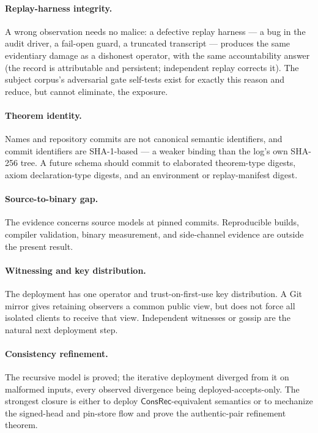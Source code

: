 \documentclass[11pt]{article}
\theoremstyle{remark}
\newcommand{\ConsRec}{\mathsf{ConsRec}}
\begin{document}
\paragraph{Replay-harness integrity.}
A wrong observation needs no malice: a defective replay harness --- a bug in
the audit driver, a fail-open guard, a truncated transcript --- produces the
same evidentiary damage as a dishonest operator, with the same accountability
answer (the record is attributable and persistent; independent replay corrects
it). The subject corpus's adversarial gate self-tests exist for exactly this
reason and reduce, but cannot eliminate, the exposure.

\paragraph{Theorem identity.}
Names and repository commits are not canonical semantic identifiers, and
commit identifiers are SHA-1-based --- a weaker binding than the log's own
SHA-256 tree. A future
schema should commit to elaborated theorem-type digests, axiom declaration-type
digests, and an environment or replay-manifest digest.

\paragraph{Source-to-binary gap.}
The evidence concerns source models at pinned commits. Reproducible builds,
compiler validation, binary measurement, and side-channel evidence are outside
the present result.

\paragraph{Witnessing and key distribution.}
The deployment has one operator and trust-on-first-use key distribution. A Git
mirror gives retaining observers a common public view, but does not force all
isolated clients to receive that view. Independent witnesses or gossip are the
natural next deployment step.

\paragraph{Consistency refinement.}
The recursive model is proved; the iterative deployment diverged from it on
malformed inputs, every observed divergence being deployed-accepts-only. The strongest closure is either to deploy
$\ConsRec$-equivalent semantics or to mechanize the signed-head and pin-store
flow and prove the authentic-pair refinement theorem.
\end{document}
